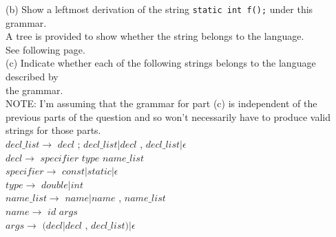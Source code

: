 \documentclass[12pt]{article}
\begin{document}
\begin{flushleft}
 \qquad \qquad 
 (b) Show a leftmost derivation of the string \texttt{static int f();} under this grammar.\\
 [2mm]
 \qquad \qquad \quad \quad
 A tree is provided to show whether the string belongs to the language.\\
 \qquad \qquad \quad \quad
 See following page.\\
 [2mm]
  
 \qquad \qquad 
 (c) Indicate whether each of the following strings belongs to the language described by\\
 \qquad \qquad \quad \quad 
 the grammar.\\
 [2mm]
 
 NOTE: I'm assuming that the grammar for part (c) is independent of the previous parts of the question and so won't necessarily have to produce valid strings for those parts.\\
 [2mm] 
 
 \qquad \qquad \quad \quad
 $decl\_list \rightarrow$ $decl$ ; $decl\_list \big| decl$ , $decl\_list \big| \epsilon$\\	
 \qquad \qquad \quad \quad
 $decl \rightarrow$ $specifier$ $type$ $name\_list$\\
 \qquad \qquad \quad \quad
 $specifier \rightarrow$ $const \big| static\big| \epsilon$\\
 \qquad \qquad \quad \quad
 $type \rightarrow$ $double\big| int$\\
 \qquad \qquad \quad \quad
 $name\_list \rightarrow$ $name \big| name$ , $name\_list$\\
 \qquad \qquad \quad \quad
 $name \rightarrow$ $id$ $args$\\
 \qquad \qquad \quad \quad
 $args \rightarrow$ $(decl \big| decl$ , $decl\_list)\big| \epsilon$\\  
 [6mm]
 
\end{flushleft}





	

	
	
	
\end{document}
